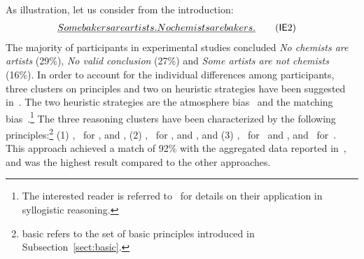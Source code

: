 \documentclass[12pt]{article}
\begin{document}
As illustration, let us consider \mbox{\MI{}} from the introduction: 
\begin{align}
 \emph{Some bakers are artists. } & \emph{No chemists are bakers.} \tag{\MI\ME 2} 
\end{align}
The majority of participants in experimental studies
concluded \emph{No chemists are artists} (29\;\%), \emph{No valid conclusion} (27\;\%)
and \emph{Some artists are not chemists} (16\;\%).
In order to account for the individual differences among participants, three clusters on principles and two on heuristic strategies have been suggested
in~\cite{declare:2017}. The two heuristic strategies are the atmosphere bias~\cite{woodworth:sells:1935} and the matching bias~\cite{Wetherick1995}.\footnote{
The interested reader is referred to~\cite{declare:2017} for details on their application in syllogistic reasoning. 
}
The three reasoning clusters have been characterized by the following principles:\footnote{{\footnotesize\textsf{basic}} refers to the set of basic principles introduced in Subsection~\ref{sect:basic}.} (1) \basic, \converse\ for \MI, and \abduction,
    (2) \basic, \converse\ for \MI, and \negFailure, and
    (3) \basic, \converse\ for \MI\ and \ME, and \contraposition\ for~\MA.
This approach achieved a match of 92\;\% with the aggregated data reported in~\cite{khemlani:2012}, and was the highest result compared to the other approaches.
\end{document}
